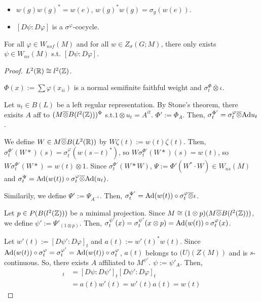 \begin{remark}
  \begin{itemize}
    \item $w(g)w(g)^*=w(e)$, $w(g)^*w(g)=\sigma_g(w(e))$.
    \item $[D\psi:D\varphi]$ is a $\sigma^\varphi$-cocycle.
  \end{itemize}
\end{remark}

\begin{theorem}
  For all $\varphi \in W_{nsf}(M)$ and for all $w \in Z_\sigma(G;M)$, there only exists $\psi \in W_{ns}(M)$ s.t. $[D\psi:D\varphi]$.
\end{theorem}

\begin{proof}
  $L^2(\mathbb{R}) \cong l^2(\mathbb{Z})$.


  $\Phi(x) := \sum \varphi(x_{ii})$ is a normal semifinite faithful weight and $\sigma_t^\Phi \overline{\otimes}\iota$.


  Let $u_t \in B(L)$ be a left regular representation.
  By Stone's theorem, there exisits $A$ aff to $(M \overline{\otimes}B(l^2(\mathbb{Z})))^\Phi$ s.t.$1 \otimes u_t = A^{it}$.
  $\Phi':=\Phi_A$.
  Then, $\sigma_t^{\Phi'} = \sigma_t^\varphi \overline{\otimes} {\rm Ad}u_t$.


  We define $W \in M \overline{\otimes} B(L^2(\mathbb{R}))$ by $W\zeta(t) := w(t)\zeta(t)$.
  Then, $\sigma_t^{\Phi'}(W*)(s) = \sigma_t^\varphi(w(s-t)^*)$, so $W\sigma_t^{\Phi'}(W*)(s) = w(t)$, so $W\sigma_t^{\Phi'}(W*) = w(t) \otimes 1$.
  Since $\sigma_t^{\Phi'}(W*W)$, $\Psi := \Phi'(W^* \cdot W) \in W_{ns}(M)$ and $\sigma_t^\Psi = {\rm Ad}(w(t))\circ \sigma_t^\varphi \overline{\otimes} {\rm Ad}(u_t)$.


  Similarily, we define $\Psi' := \Psi_{A^{-1}}$.
  Then, $\sigma_t^{\Psi'} = {\rm Ad}(w(t))\circ \sigma_t^\varphi \overline{\otimes} \iota$.


  Let $p \in P(B(l^2(\mathbb{Z})))$ be a minimal projection.
  Since $M \cong (1 \otimes p)(M \overline{\otimes}B(l^2(\mathbb{Z})))$, we define $\psi' := \Psi'_{(1 \otimes p)}$.
  Then, $\sigma_t^{\psi'}(x) = \sigma_t^{\psi'}(x \otimes p) = {\rm Ad}(w(t))\circ\sigma_t^\varphi(x)$.


  Let $w'(t) := [D\psi':D\varphi]_t$ and $a(t) := w'(t)^*w(t)$.
  Since ${\rm Ad}(w(t)) \circ \sigma_t^\varphi = \sigma_t^{\varphi'} = {\rm Ad}(w(t)) \circ \sigma_t^\varphi$,
  $a(t)$ belongs to $\mathcal(U)(Z(M))$ and is $s$-continuous.
  So, there exists $A$ affiliated to $M^{\psi'}$.
  $\psi := \psi'_A$.
  Then,
  \begin{align*}
    [D\psi:D\phi]_t
    &= [D\psi:D\psi']_t[D\psi':D\varphi]_t \\
    &= a(t)w'(t) = w'(t)a(t) =w(t)
  \end{align*}
\end{proof}
  
